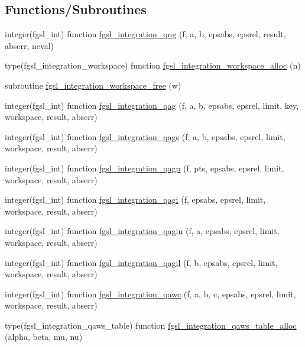 \subsection*{Functions/\+Subroutines}
\begin{DoxyCompactItemize}
\item 
integer(fgsl\+\_\+int) function \hyperlink{integration_8finc_aba13a45b5692a07f1722280eca723ef5}{fgsl\+\_\+integration\+\_\+qng} (f, a, b, epsabs, epsrel, result, abserr, neval)
\item 
type(fgsl\+\_\+integration\+\_\+workspace) function \hyperlink{integration_8finc_a258c0d16c738f2b09e6ba3a095eb4c1a}{fgsl\+\_\+integration\+\_\+workspace\+\_\+alloc} (n)
\item 
subroutine \hyperlink{integration_8finc_a6b0e32245d2c47a94b7a0d377fd88e4b}{fgsl\+\_\+integration\+\_\+workspace\+\_\+free} (w)
\item 
integer(fgsl\+\_\+int) function \hyperlink{integration_8finc_a13d6dc8aee5e46de8ca23b39414615a2}{fgsl\+\_\+integration\+\_\+qag} (f, a, b, epsabs, epsrel, limit, key, workspace, result, abserr)
\item 
integer(fgsl\+\_\+int) function \hyperlink{integration_8finc_a0f40a3f4743cf93f49855ac87cdfe988}{fgsl\+\_\+integration\+\_\+qags} (f, a, b, epsabs, epsrel, limit, workspace, result, abserr)
\item 
integer(fgsl\+\_\+int) function \hyperlink{integration_8finc_a97bc9870ebd60e3b5548a21fa7e8e478}{fgsl\+\_\+integration\+\_\+qagp} (f, pts, epsabs, epsrel, limit, workspace, result, abserr)
\item 
integer(fgsl\+\_\+int) function \hyperlink{integration_8finc_a6f86306a814963ccd09bc4a6839ba0c8}{fgsl\+\_\+integration\+\_\+qagi} (f, epsabs, epsrel, limit, workspace, result, abserr)
\item 
integer(fgsl\+\_\+int) function \hyperlink{integration_8finc_a4ec3624cdae37303102042cb3874ab7d}{fgsl\+\_\+integration\+\_\+qagiu} (f, a, epsabs, epsrel, limit, workspace, result, abserr)
\item 
integer(fgsl\+\_\+int) function \hyperlink{integration_8finc_a7292df51e041f35ed4d1c40e4b44e2b2}{fgsl\+\_\+integration\+\_\+qagil} (f, b, epsabs, epsrel, limit, workspace, result, abserr)
\item 
integer(fgsl\+\_\+int) function \hyperlink{integration_8finc_a9544e1c2217de9f6a9c8cafdf348330b}{fgsl\+\_\+integration\+\_\+qawc} (f, a, b, c, epsabs, epsrel, limit, workspace, result, abserr)
\item 
type(fgsl\+\_\+integration\+\_\+qaws\+\_\+table) function \hyperlink{integration_8finc_a1b6e906b66759c0fdf4ff29cce1b3d7d}{fgsl\+\_\+integration\+\_\+qaws\+\_\+table\+\_\+alloc} (alpha, beta, mu, nu)

\end{DoxyCompactItemize}
